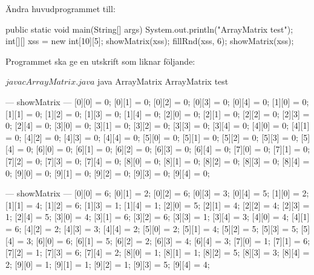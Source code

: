 Ändra huvudprogrammet till:
\begin{Code}[language=Java]
    public static void main(String[] args) {
        System.out.println("ArrayMatrix test");
        int[][] xss = new int[10][5];
        showMatrix(xss);
        fillRnd(xss, 6);
        showMatrix(xss);
    }
\end{Code}

Programmet ska ge en utskrift som liknar följande:
\begin{REPL}
$ javac ArrayMatrix.java
$ java ArrayMatrix
ArrayMatrix test

--- showMatrix ---
[0][0] = 0; [0][1] = 0; [0][2] = 0; [0][3] = 0; [0][4] = 0;
[1][0] = 0; [1][1] = 0; [1][2] = 0; [1][3] = 0; [1][4] = 0;
[2][0] = 0; [2][1] = 0; [2][2] = 0; [2][3] = 0; [2][4] = 0;
[3][0] = 0; [3][1] = 0; [3][2] = 0; [3][3] = 0; [3][4] = 0;
[4][0] = 0; [4][1] = 0; [4][2] = 0; [4][3] = 0; [4][4] = 0;
[5][0] = 0; [5][1] = 0; [5][2] = 0; [5][3] = 0; [5][4] = 0;
[6][0] = 0; [6][1] = 0; [6][2] = 0; [6][3] = 0; [6][4] = 0;
[7][0] = 0; [7][1] = 0; [7][2] = 0; [7][3] = 0; [7][4] = 0;
[8][0] = 0; [8][1] = 0; [8][2] = 0; [8][3] = 0; [8][4] = 0;
[9][0] = 0; [9][1] = 0; [9][2] = 0; [9][3] = 0; [9][4] = 0;

--- showMatrix ---
[0][0] = 6; [0][1] = 2; [0][2] = 6; [0][3] = 3; [0][4] = 5;
[1][0] = 2; [1][1] = 4; [1][2] = 6; [1][3] = 1; [1][4] = 1;
[2][0] = 5; [2][1] = 4; [2][2] = 4; [2][3] = 1; [2][4] = 5;
[3][0] = 4; [3][1] = 6; [3][2] = 6; [3][3] = 1; [3][4] = 3;
[4][0] = 4; [4][1] = 6; [4][2] = 2; [4][3] = 3; [4][4] = 2;
[5][0] = 2; [5][1] = 4; [5][2] = 5; [5][3] = 5; [5][4] = 3;
[6][0] = 6; [6][1] = 5; [6][2] = 2; [6][3] = 4; [6][4] = 3;
[7][0] = 1; [7][1] = 6; [7][2] = 1; [7][3] = 6; [7][4] = 2;
[8][0] = 1; [8][1] = 1; [8][2] = 5; [8][3] = 3; [8][4] = 2;
[9][0] = 1; [9][1] = 1; [9][2] = 1; [9][3] = 5; [9][4] = 4;

\end{REPL}





\clearpage


\ExtraTasks %

\SOLUTION


\TaskSolved \what

